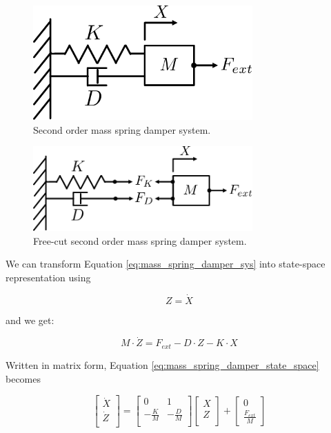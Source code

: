 \begin{figure}
   \centering
   \includegraphics[width=0.75\textwidth]{images/mass_spring_damper.pdf}
   \caption{Second order mass spring damper system.}
   \label{pics:mass_spring_damper}
\end{figure}

\begin{figure}
   \centering
   \includegraphics[width=0.75\textwidth]{images/mass_spring_damper_freecut.pdf}
   \caption{Free-cut second order mass spring damper system.}
   \label{pics:mass_spring_damper_freecut}
\end{figure}

We can transform Equation \ref{eq:mass_spring_damper_sys} into state-space representation using 

\begin{equation}
Z = \dot{X}
\end{equation}

and we get:

\begin{equation}
M \cdot \dot{Z} = F_{ext} -  D \cdot Z - K \cdot X
\label{eq:mass_spring_damper_state_space}
\end{equation}

Written in matrix form, Equation \ref{eq:mass_spring_damper_state_space} becomes

\begin{equation}
\begin{bmatrix}
\dot{X} \\
\dot{Z} \\
\end{bmatrix} = \begin{bmatrix}
0 & 1 \\
- \frac{K}{M} & - \frac{D}{M}\\
\end{bmatrix} \begin{bmatrix}
X \\
Z \\
\end{bmatrix} + \begin{bmatrix}
0 \\
\frac{F_{ext}}{M} 
\end{bmatrix}
\end{equation}

